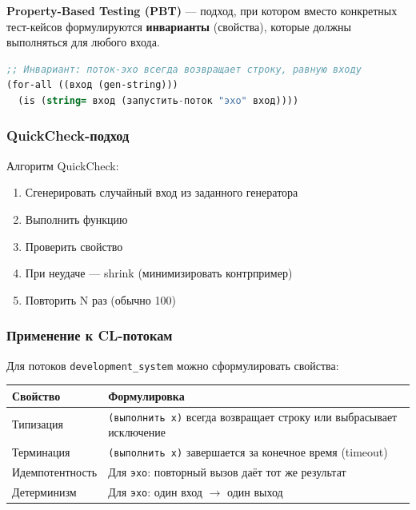 \documentclass[12pt, a4paper, twoside]{article}
\begin{document}
\textbf{Property-Based Testing (PBT)} --- подход, при котором вместо конкретных
тест-кейсов формулируются \textbf{инварианты} (свойства), которые должны
выполняться для любого входа.

\begin{lstlisting}[language=CommonLisp,caption={Пример property для потока эхо}]
;; Инвариант: поток-эхо всегда возвращает строку, равную входу
(for-all ((вход (gen-string)))
  (is (string= вход (запустить-поток "эхо" вход))))
\end{lstlisting}

\subsubsection{QuickCheck-подход}

Алгоритм QuickCheck:

\begin{enumerate}[leftmargin=1.5em]
  \item Сгенерировать случайный вход из заданного генератора
  \item Выполнить функцию
  \item Проверить свойство
  \item При неудаче --- shrink (минимизировать контрпример)
  \item Повторить N раз (обычно 100)
\end{enumerate}

\subsubsection{Применение к CL-потокам}

Для потоков \texttt{development\_system} можно сформулировать свойства:

\begin{center}
\begin{tabularx}{\textwidth}{lL}
  \toprule
  \textbf{Свойство} & \textbf{Формулировка} \\
  \midrule
  Типизация       & \texttt{(выполнить x)} всегда возвращает строку или выбрасывает исключение \\
  Терминация      & \texttt{(выполнить x)} завершается за конечное время (timeout) \\
  Идемпотентность & Для \texttt{эхо}: повторный вызов даёт тот же результат \\
  Детерминизм     & Для \texttt{эхо}: один вход $\to$ один выход \\
  \bottomrule
\end{tabularx}
\end{center}
\end{document}

